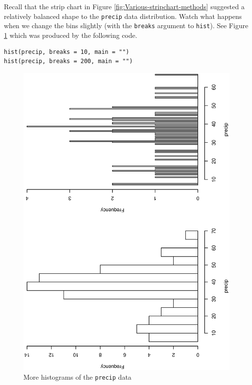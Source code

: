 \documentclass[captions=tableheading]{scrbook}
\begin{document}
\begin{example}
Recall that the strip chart in Figure \ref{fig:Various-stripchart-methods} suggested a relatively balanced shape to the \texttt{precip} data distribution. Watch what happens when we change the bins slightly (with the \texttt{breaks} argument to \texttt{hist}). See Figure \ref{fig:histograms-bins} which was produced by the following code.



\begin{verbatim}
hist(precip, breaks = 10, main = "")
hist(precip, breaks = 200, main = "")
\end{verbatim}







\begin{figure}[th]
  \includegraphics[angle=270, totalheight=4in]{ps/histograms-bins.ps}
  \caption{More histograms of the \texttt{precip} data}
  \label{fig:histograms-bins}
\end{figure}


\end{example}
\end{document}
